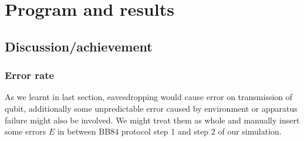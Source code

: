 \documentclass[12pt]{article}
\begin{document}
 \section{Program and results}
\subsection{Discussion/achievement}
\subsubsection{Error rate}
As we learnt in last section, eavesdropping would cause error on transmission of qubit, additionally some unpredictable error caused by environment or apparatus failure might also be involved. We might treat them as whole and manually insert some errors $E$ in between BB84 protocol step 1 and step 2 of our simulation. 
\end{document}
